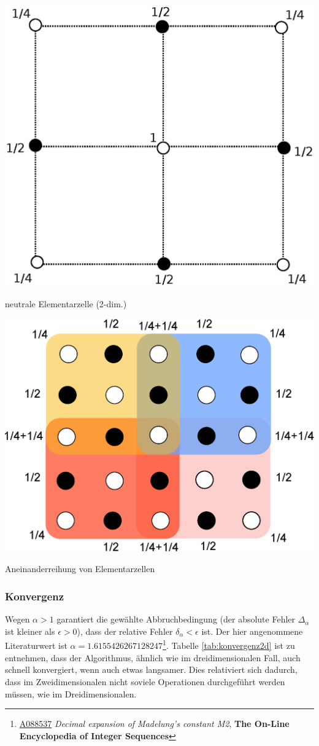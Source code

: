 \documentclass[10pt,a4paper]{article}
\begin{document}
\vspace{6pt}
\begin{minipage}[c]{0.5\textwidth}
\captionsetup{type=figure}
\begin{center}
\includegraphics[height=0.45\textwidth]{./figures/quadrat.eps}
\vspace{-8pt}
\caption{neutrale Elementarzelle (2-dim.)}
\label{skalierungsgrafik2d}
\end{center}
\end{minipage}
\begin{minipage}[c]{0.45\textwidth}
\captionsetup{type=figure}
\begin{center}
\includegraphics[height=0.5\textwidth]{./figures/elementarzelle.eps}
\caption{Aneinanderreihung von Elementarzellen}
\label{zellensumme}
\end{center}
\end{minipage}	
\subsubsection{Konvergenz}

Wegen $\alpha > 1$ garantiert die gewählte Abbruchbedingung (der absolute Fehler $\Delta_\alpha$ ist kleiner als $\epsilon > 0$), 
dass der relative Fehler $\delta_\alpha < \epsilon$ ist. Der hier angenommene Literaturwert ist $\alpha = 1.6155426267128247$\footnote{\href{https://oeis.org/A088537}{A088537} \emph{Decimal expansion of Madelung's constant M2}, \textbf{The On-Line Encyclopedia of Integer Sequences}}. Tabelle \ref{tab:konvergenz2d} ist zu entnehmen, dass der Algorithmus, ähnlich wie im dreidimensionalen Fall, auch schnell konvergiert, wenn auch etwas langsamer. Dies relativiert sich dadurch, dass im Zweidimensionalen
nicht soviele Operationen durchgeführt werden müssen, wie im Dreidimensionalen.
\end{document}
